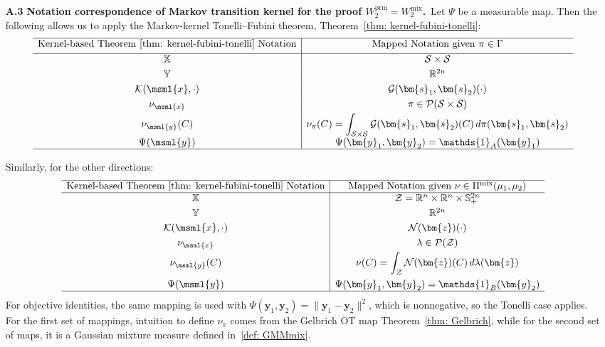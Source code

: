\documentclass[opre,sglanonrev]{informs4}
\newcommand{\mK}{\mathcal{K}}          %
\newcommand{\mZ}{\mathcal{Z}}
\newcommand{\mS}{\mathcal{S}}
\newcommand{\mN}{\mathcal{N}}
\newcommand{\mG}{\mathcal{G}}
\newcommand{\mP}{\mathcal{P}}
\newcommand{\mfZ}{\mathfrak{Z}}
\newcommand{\mbX}{\mathbb{X}}
\newcommand{\mbY}{\mathbb{Y}}
\newcommand{\mbR}{\mathbb R}
\newcommand{\mbS}{\mathbb S}
\newcommand{\ind}{\mathds{1}}
\newcommand{\bmean}{\bm{m}}
\newcommand{\bs}{\bm{s}}
\newcommand{\by}{\bm{y}}
\newcommand{\bz}{\bm{z}}
\newcommand{\bA}{\bm{A}}
\newcommand{\bQ}{\bm Q}
\begin{document}
{\begin{APPENDICES}
\begin{itemize}[leftmargin=1em]
\begin{enumerate}[leftmargin=0.5em]
But the map $h:\mbX\times\mfZ\to \mbY,\,\,\, h((\bmean,\bQ),\bz)=\bmean + \bA(\bQ)\bz$
is measurable because it is built from measurable operations (addition, matrix–vector multiplication) and \(\bA(\cdot)\) is measurable by construction. Then $g_C = \ind_C\circ h$
is measurable since \(\ind_C\) is Borel measurable on \(\mbY\). Therefore, by the lemma, \(\msml{x}\mapsto\int g_C(\msml{x},\bz)\,d\gamma(\bz)\) is measurable. This proves condition (b).
\end{enumerate}
\item[\textbf{A.3}]\textbf{Notation correspondence of Markov transition kernel for the proof $W_2^\mathrm{prm} = W_2^\mathrm{mix}$.}\,
Let \(\Psi\) be a measurable map. Then the following allows us to apply
the Markov-kernel Tonelli--Fubini theorem, Theorem~\ref{thm: kernel-fubini-tonelli}:
\[
\begin{array}{c|c}
\hline
\text{Kernel-based Theorem~\ref{thm: kernel-fubini-tonelli} Notation} & \text{Mapped Notation given $\pi \in \Gamma$} \\[0.3em]
\hline
\mbX & \mS \times \mS \\[0.3em]
\mbY & \mbR^{2n}\\[0.3em]
\mK(\msml{x},\cdot) & \mG(\bs_1, \bs_2)(\cdot) \\[0.3em]
\nu_\msml{x} & \pi \in \mP(\mS \times \mS) \\[0.3em]
\nu_\msml{y}(C) & \displaystyle \nu_{\pi}(C)
  = \int_{\mS\times\mS}
        \mG(\bs_1, \bs_2)(C)\,d\pi(\bs_1,\bs_2) \\[0.3em]
\Psi(\msml{y}) & \Psi(\by_1,\by_2) =  \ind_A(\by_1) \\
\hline
\end{array}
\]


Similarly, for the other directions:
\[
\begin{array}{c|c}
\hline
\text{Kernel-based Theorem~\ref{thm: kernel-fubini-tonelli} Notation} & \text{Mapped Notation given $\nu \in \Pi^\mathrm{mix}(\mu_1, \mu_2)$} \\ \hline
\mbX & \mZ = \mbR^n \times \mbR^n \times \mbS^{2n}_+ \\[0.3em]
\mbY & \mbR^{2n}\\[0.3em]
\mK(\msml{x},\cdot) & \mN(\bz)(\cdot) \\[0.3em]
\nu_\msml{x} & \lambda \in \mP(\mZ) \\[0.3em]
\nu_\msml{y}(C) & \displaystyle \nu(C) = \int_{\mZ} \mN(\bz)(C)\,d\lambda(\bz) \\[1em]
\Psi(\msml{y}) & \Psi(\by_1, \by_2) = \ind_B(\by_2) \\
\hline
\end{array}
\]
For objective identities, the same mapping is used with
\(\Psi(\by_1,\by_2)=\|\by_1-\by_2\|^2\), which is nonnegative, so the Tonelli case applies. For the first set of mappings, intuition to define $\nu_\pi$ comes from the Gelbrich OT map Theorem~\ref{thm: Gelbrich}, while for the second set of maps, it is a Gaussian mixture measure defined in~\eqref{def: GMMmix}.


\end{itemize}
\end{APPENDICES}}
\end{document}
